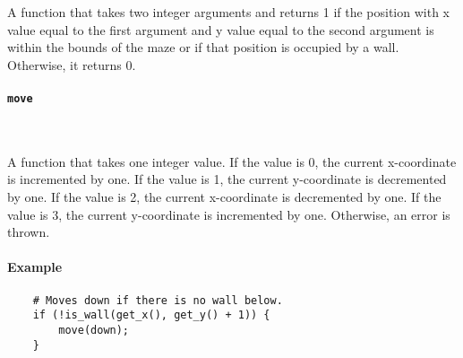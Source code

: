 A function that takes two integer arguments and returns 1 if the position with x value equal to the first argument and y value equal to the second argument is within the bounds of the maze or if that position is occupied by a wall. Otherwise, it returns 0.

\paragraph{\texttt{move}} \

A function that takes one integer value. If the value is 0, the current x-coordinate is incremented by one. If the value is 1, the current y-coordinate is decremented by one. If the value is 2, the current x-coordinate is decremented by one. If the value is 3, the current y-coordinate is incremented by one. Otherwise, an error is thrown.

\paragraph{Example}

\begin{verbatim}
    # Moves down if there is no wall below.
    if (!is_wall(get_x(), get_y() + 1)) {
        move(down);
    }
\end{verbatim}
